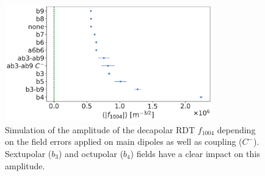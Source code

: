 \begin{figure}[!htb]
    \centering
    \includegraphics[width=0.8\textwidth]{./images/f1004/f1004_several_factors.pdf}
    \caption{Simulation of the amplitude of the decapolar RDT $f_{1004}$ depending on the field
             errors applied on main dipoles as well as coupling ($C^-$). Sextupolar ($b_3$) and
             octupolar ($b_4$) fields have a clear impact on this amplitude.}
    \label{fig:decapoles:rdts:contributions}
\end{figure}


%
%


\subsubsection{}

